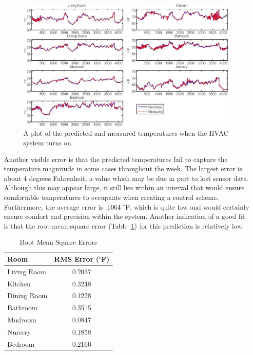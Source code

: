 \begin{figure}[!htb]
\begin{center}
\includegraphics[width=0.8\columnwidth]{fig/predVsMeasured.eps}
\end{center}
\caption[Predicted and measured temperatures]{A plot of the predicted and
measured temperatures when the HVAC system turns on.}
\label{fig:predVsMeasured}
\end{figure}

Another visible error is that the predicted temperatures fail to capture the
temperature magnitude in some cases throughout the week. The largest error is
about 4 degrees Fahrenheit, a value which may be due in part to lost sensor
data. Although this may appear large, it still lies within an interval that
would ensure comfortable temperatures to occupants when creating a control
scheme. Furthermore, the average error is .1064 $^{\circ}$F, which is
quite low and would certainly ensure comfort and precision within the
system. Another indication of a good fit is that the root-mean-square error
(Table~\ref{table:rmsError}) for this prediction is relatively low.

\begin{table}[!htb]
  \caption{Root Mean Square Errors}
  \centering
  \begin{tabular}{| l | c |}
    \hline
    Room & RMS Error ($^{\circ}$F)\\ \hline
    Living Room & 0.2037 \\ \hline
    Kitchen & 0.3248 \\ \hline
    Dining Room & 0.1228 \\ \hline
    Bathroom & 0.3515 \\ \hline
    Mudroom & 0.0847 \\ \hline
    Nursery & 0.1858 \\ \hline
    Bedroom & 0.2160 \\
    \hline
  \end{tabular}
  \label{table:rmsError}
\end{table}

